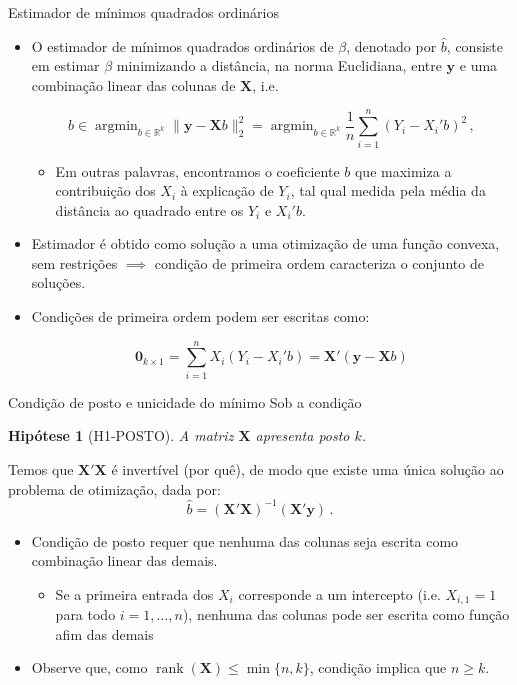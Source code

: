 \documentclass[11pt]{beamer}
\newtheorem{assumption}{Hipótese}
\begin{document}
\begin{frame}{Estimador de mínimos quadrados ordinários}
\begin{itemize}
	\item O estimador de mínimos quadrados ordinários de $\beta$, denotado por $\hat{b}$, consiste em estimar $\beta$ minimizando a distância, na norma Euclidiana, entre $\boldsymbol{y}$ e uma combinação linear das colunas de $\boldsymbol{X}$, i.e. 
	
	$$\hat{b} \in \operatorname{argmin}_{b\in \mathbb{R}^k} \lVert \boldsymbol{y} - \boldsymbol{X}b \rVert_2^2 = \operatorname{argmin}_{b\in \mathbb{R}^k}\frac{1}{n}\sum_{i=1}^n (Y_i - X_i'b)^2\, ,$$
	\begin{itemize}
		\item Em outras palavras, encontramos o coeficiente $b$ que maximiza a contribuição dos $X_i$ à explicação de $Y_i$, tal qual medida pela média da distância ao quadrado entre os $Y_i$ e $X_i'b$.
	\end{itemize}
	\item Estimador é obtido como solução a uma otimização de uma função convexa, sem restrições $\implies$ condição de primeira ordem caracteriza o conjunto de soluções.
	\item Condições de primeira ordem podem ser escritas como:
	
	$$\boldsymbol{0}_{k \times 1}= \sum_{i=1}^n X_i(Y_i - X_i'b) = \boldsymbol{X}'(\boldsymbol{y}-\boldsymbol{X}b)$$
	
	
	
\end{itemize}
\end{frame}
\begin{frame}{Condição de posto e unicidade do mínimo}
Sob a condição
\begin{assumption}[H1-POSTO]
	A matriz $\boldsymbol{X}$ apresenta posto $k$.
	\end{assumption}
	Temos que $\boldsymbol{X}'\boldsymbol{X}$ é invertível (por quê), de modo que  existe uma única solução ao problema de otimização, dada por:
	$$\hat{b} = (\boldsymbol{X}'\boldsymbol{X})^{-1}(\boldsymbol{X}'\boldsymbol{y})\, .$$
	\begin{itemize}
		\item Condição de posto requer que nenhuma das colunas seja escrita como combinação linear das demais.
		\begin{itemize}
			\item Se a primeira entrada dos $X_i$ corresponde a um intercepto (i.e. $X_{i,1}=1$ para todo $i=1,\ldots, n$), nenhuma das colunas pode ser escrita como função afim das demais 
		\end{itemize}
		\item Observe que, como $\operatorname{rank}(\boldsymbol{X}) \leq \min\{n,k\}$, condição implica que $n \geq k$.
	\end{itemize}
\end{frame}
\end{document}
